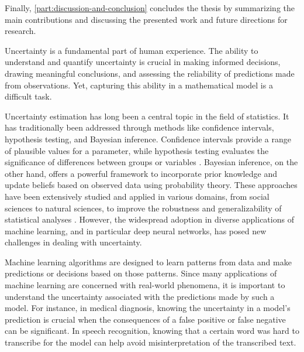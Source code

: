 Finally, \cref{part:discussion-and-conclusion} concludes the thesis by summarizing the main contributions and discussing the presented work and future directions for research.


















\iffalse


Uncertainty is a fundamental part of human experience. The ability to understand and quantify uncertainty is crucial in making informed decisions, drawing meaningful conclusions, and assessing the reliability of predictions made from observations. Yet, capturing this ability in a mathematical model is a difficult task. 

Uncertainty estimation has long been a central topic in the field of statistics. It has traditionally been addressed through methods like confidence intervals, hypothesis testing, and Bayesian inference. Confidence intervals provide a range of plausible values for a parameter, while hypothesis testing evaluates the significance of differences between groups or variables \cite{blitzstein_introduction_2019}. Bayesian inference, on the other hand, offers a powerful framework to incorporate prior knowledge and update beliefs based on observed data using probability theory. These approaches have been extensively studied and applied in various domains, from social sciences to natural sciences, to improve the robustness and generalizability of statistical analyses \cite{gelman_bayesian_2013}. However, the widespread adoption in diverse applications of machine learning, and in particular deep neural networks, has posed new challenges in dealing with uncertainty. 

Machine learning algorithms are designed to learn patterns from data and make predictions or decisions based on those patterns. Since many applications of machine learning are concerned with real-world phenomena, it is important to understand the uncertainty associated with the predictions made by such a model. For instance, in medical diagnosis, knowing the uncertainty in a model's prediction is crucial when the consequences of a false positive or false negative can be significant. In speech recognition, knowing that a certain word was hard to transcribe for the model can help avoid misinterpretation of the transcribed text.


